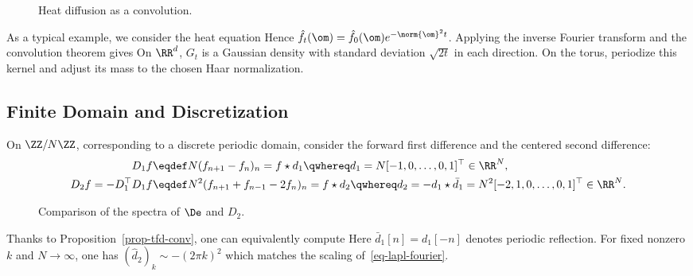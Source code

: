 \begin{figure}[tbp]
\centering
{}
\caption{Heat diffusion as a convolution.}
\label{fig-heat}
\end{figure}

As a typical example, we consider the heat equation
Hence $\hat f_t(\om) = \hat f_0(\om) e^{-\norm{\om}^2 t}$. Applying the inverse Fourier transform and the convolution theorem gives
On $\RR^d$, $G_t$ is a Gaussian density with standard deviation $\sqrt{2t}$ in each direction. On the torus, periodize this kernel and adjust its mass to the chosen Haar normalization.


\subsection{Finite Domain and Discretization}

On $\ZZ/N\ZZ$, corresponding to a discrete periodic domain, consider the forward first difference and the centered second difference:
\begin{align}\label{eq-disc-diff-1}
	D_1 f &\eqdef N(f_{n+1}-f_n)_n=f\star d_1\qwhereq d_1=N[-1,0,\ldots,0,1]^\top \in \RR^N, \\
	\label{eq-disc-diff-2}
	D_2 f=-D_1^\top D_1 f & \eqdef N^2 (f_{n+1}+f_{n-1}-2f_n)_n = f \star d_2 \qwhereq d_2=-d_1\star\bar d_1=N^2[-2,1,0,\ldots,0,1]^\top \in \RR^N.
\end{align}
\begin{figure}[tbp]
\centering
{}
\caption{Comparison of the spectra of $\De$ and $D_2$.}
\label{fig-review-fourier-finite-difference-spectrum}
\end{figure}
Thanks to Proposition~\ref{prop-tfd-conv}, one can equivalently compute
Here $\bar d_1[n]=d_1[-n]$ denotes periodic reflection. For fixed nonzero $k$ and $N\to\infty$, one has $(\hat d_2)_k \sim -(2\pi k)^2$ which matches the scaling of~\eqref{eq-lapl-fourier}.


